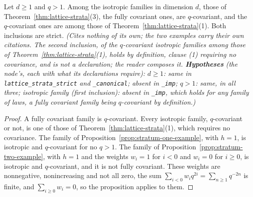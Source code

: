 \begin{theorem}
\label{thm:lattice-strata-strict}
\leanok
{}
Let $d \ge 1$ and $q > 1$. Among the isotropic families in dimension $d$, those of
Theorem~\ref{thm:lattice-strata}(3), the fully covariant ones, are $q$-covariant, and the
$q$-covariant ones are among those of Theorem~\ref{thm:lattice-strata}(1). Both inclusions are
strict.
\statusT\quad\emph{(Cites nothing of its own; the two examples carry their own citations.
The second inclusion, of the $q$-covariant isotropic families among those of
Theorem~\ref{thm:lattice-strata}(1), holds by definition, clause (1) requiring no covariance, and is
not a declaration; the reader composes it. \textbf{Hypotheses} (the node's, each with what its
declarations require): $d \ge 1$: same in \texttt{lattice\_strata\_strict} and
\texttt{\_canonical}; absent in \texttt{\_imp}; $q > 1$: same, in all three; isotropic family
(first inclusion): absent in \texttt{\_imp}, which holds for any family of laws, a fully
covariant family being $q$-covariant by definition.)}
\end{theorem}

\begin{proof}
\leanok
{}
A fully covariant family is $q$-covariant. Every isotropic family, $q$-covariant or not, is one of
those of Theorem~\ref{thm:lattice-strata}(1), which requires no covariance. The family of
Proposition~\ref{prop:stratum-one-example}, with $h = 1$, is isotropic and $q$-covariant for no
$q > 1$. The family of Proposition~\ref{prop:stratum-two-example}, with $h = 1$ and the weights
$w_i = 1$ for $i < 0$ and $w_i = 0$ for $i \ge 0$, is isotropic and $q$-covariant, and it is not
fully covariant. These weights are nonnegative, nonincreasing and not all zero, the sum
$\sum_{i<0}w_iq^{2i} = \sum_{n\ge1}q^{-2n}$ is finite, and $\sum_{i\ge0}w_i = 0$, so the
proposition applies to them.
\end{proof}

